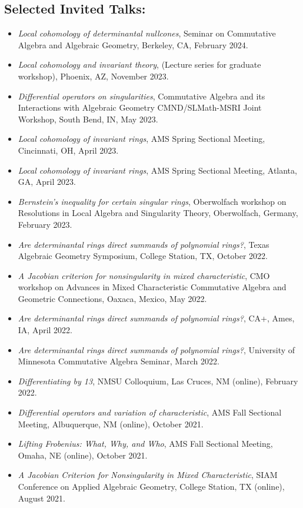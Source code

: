 \documentclass[12pt]{amsart}
\begin{document}
\subsection*{Selected Invited Talks:}
\begin{itemize}[leftmargin=9mm]
\item \emph{Local cohomology of determinantal nullcones}, Seminar on Commutative Algebra and Algebraic Geometry, Berkeley, CA, February 2024.
\item \emph{Local cohomology and invariant theory}, (Lecture series for graduate workshop), Phoenix, AZ, November 2023.
\item \emph{Differential operators on singularities}, Commutative Algebra and its Interactions with Algebraic Geometry CMND/SLMath-MSRI Joint Workshop, South Bend, IN, May 2023.
\item \emph{Local cohomology of invariant rings}, AMS Spring Sectional Meeting, Cincinnati, OH, April 2023.
\item \emph{Local cohomology of invariant rings}, AMS Spring Sectional Meeting, Atlanta, GA, April 2023.
\item \emph{Bernstein’s inequality for certain singular rings}, Oberwolfach workshop on Resolutions in Local Algebra and Singularity Theory, Oberwolfach, Germany, February 2023.
\item \emph{Are determinantal rings direct summands of polynomial rings?}, Texas Algebraic Geometry Symposium, College Station, TX, October 2022.
\item \emph{A Jacobian criterion for nonsingularity in mixed characteristic}, CMO workshop on Advances in Mixed Characteristic Commutative Algebra and Geometric Connections, Oaxaca, Mexico, May 2022.
\item \emph{Are determinantal rings direct summands of polynomial rings?}, CA+, Ames, IA, April 2022.
\item \emph{Are determinantal rings direct summands of polynomial rings?}, University of Minnesota Commutative Algebra Seminar, March 2022.
\item \emph{Differentiating by 13}, NMSU Colloquium, Las Cruces, NM (online), February 2022.
\item \emph{Differential operators and variation of characteristic}, AMS Fall Sectional Meeting, Albuquerque, NM (online), October 2021.
\item \emph{Lifting Frobenius: What, Why, and Who}, AMS Fall Sectional Meeting, Omaha, NE (online), October 2021.
\item \emph{A Jacobian Criterion for Nonsingularity in Mixed Characteristic},  SIAM Conference on Applied Algebraic Geometry, College Station, TX (online), August 2021. 

\end{itemize}
\end{document}
